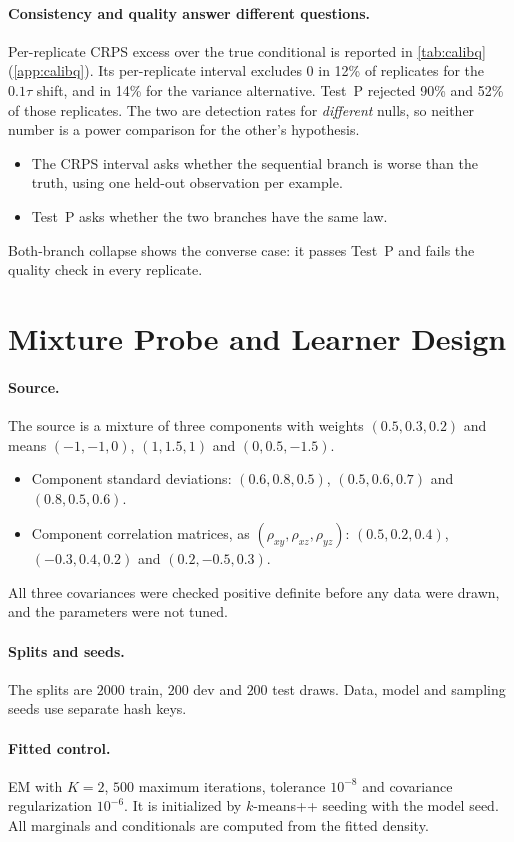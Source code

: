\documentclass{article}
\theoremstyle{plain}
\theoremstyle{definition}
\theoremstyle{remark}
\begin{document}
\paragraph{Consistency and quality answer different questions.}
Per-replicate CRPS excess over the true conditional is reported in \cref{tab:calibq} (\cref{app:calibq}).
Its per-replicate interval excludes $0$ in 12\% of replicates for the $0.1\tau$ shift, and in 14\% for the variance alternative. Test~P rejected 90\% and 52\% of those replicates.
The two are detection rates for \emph{different} nulls, so neither number is a power comparison for the other's hypothesis.
\begin{itemize}
\item The CRPS interval asks whether the sequential branch is worse than the truth, using one held-out observation per example.
\item Test~P asks whether the two branches have the same law.
\end{itemize}
Both-branch collapse shows the converse case: it passes Test~P and fails the quality check in every replicate.



\section{Mixture Probe and Learner Design}
\label{app:mixture}
\paragraph{Source.}
The source is a mixture of three components with weights $(0.5,0.3,0.2)$ and means $(-1,-1,0)$, $(1,1.5,1)$ and $(0,0.5,-1.5)$.
\begin{itemize}
\item Component standard deviations: $(0.6,0.8,0.5)$, $(0.5,0.6,0.7)$ and $(0.8,0.5,0.6)$.
\item Component correlation matrices, as $(\rho_{xy},\rho_{xz},\rho_{yz})$: $(0.5,0.2,0.4)$, $(-0.3,0.4,0.2)$ and $(0.2,-0.5,0.3)$.
\end{itemize}
All three covariances were checked positive definite before any data were drawn, and the parameters were not tuned.
\paragraph{Splits and seeds.}
The splits are $2000$ train, $200$ dev and $200$ test draws. Data, model and sampling seeds use separate hash keys.
\paragraph{Fitted control.}
EM with $K=2$, $500$ maximum iterations, tolerance $10^{-8}$ and covariance regularization $10^{-6}$. It is initialized by $k$-means++ seeding with the model seed.
All marginals and conditionals are computed from the fitted density.
\end{document}
